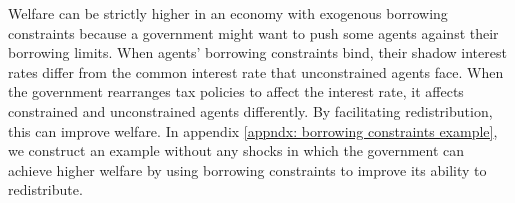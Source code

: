 \documentclass[thmsb,11pt]{article}
\begin{document}
Welfare can  be strictly higher in an economy  with exogenous
borrowing constraints  because  a government might want to
push some agents against their borrowing limits. When agents' borrowing
constraints bind, their shadow interest rates differ from the
common interest rate that unconstrained agents face. When the government rearranges tax
policies to  affect the  interest rate, it affects constrained and unconstrained agents
 differently.  By facilitating
redistribution, this can improve welfare. %
In appendix \ref{appndx: borrowing constraints example}, we construct an example without any
shocks in which the government can achieve higher welfare by using borrowing
constraints to improve its ability to redistribute.
%
\end{document}
